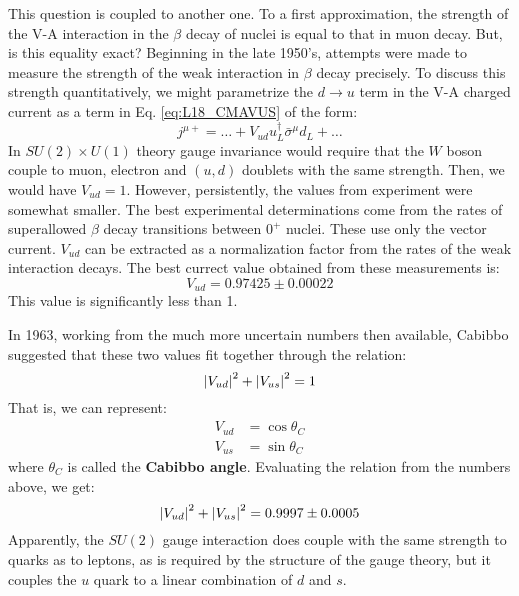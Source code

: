 \documentclass[../../main/main.tex]{subfiles}
\begin{document}
This question is coupled to another one. To a first approximation, the strength of the V-A interaction in the \( \beta \) decay of nuclei is equal to that in muon decay. But, is this equality exact? Beginning in the late 1950's, attempts were made to measure the strength of the weak interaction in \( \beta \) decay precisely. To discuss this strength quantitatively, we might parametrize the \( d \rightarrow u \) term in the V-A charged current as a term in Eq. \ref{eq:L18_CMAVUS} of the form:
\begin{equation}
	j^{\mu +}
	=
	\dots +
	V_{ud} u^{\dag}_L \bar{\sigma}^{\mu} d_L +
	\dots
	\label{eq:}
\end{equation}
In \( SU(2) \times U(1) \) theory gauge invariance would require that the \( W \) boson couple to muon, electron and \( (u,d) \) doublets with the same strength. Then, we would have \( V_{ud} = 1 \). However, persistently, the values from experiment were somewhat smaller. The best experimental determinations come from the rates of superallowed \( \beta \) decay transitions between \( 0^+ \) nuclei. These use only the vector current. \( V_{ud} \) can be extracted as a normalization factor from the rates of the weak interaction decays. The best currect value obtained from these measurements is:
\begin{equation}
	V_{ud}
	=
	0.97425 \pm 0.00022
	\label{eq:}
\end{equation}
This value is significantly less than 1.

In 1963, working from the much more uncertain numbers then available, Cabibbo suggested that these two values fit together through the relation:
\begin{equation}
	\abs{V_{ud}}^2 + \abs{V_{us}}^2
	=
	1
	\label{eq:}
\end{equation}
That is, we can represent:
\begin{align}
	V_{ud} &= \cos\theta_C	\\
	V_{us} &= \sin\theta_C
\end{align}
where \( \theta_C \) is called the \textbf{Cabibbo angle}. Evaluating the relation from the numbers above, we get:
\begin{equation}
	\abs{V_{ud}}^2 + \abs{V_{us}}^2
	=
	0.9997 \pm 0.0005
	\label{eq:}
\end{equation}
Apparently, the \( SU(2) \) gauge interaction does couple with the same strength to quarks as to leptons, as is required by the structure of the gauge theory, but it couples the \( u \) quark to a linear combination of \( d \) and \( s \).
\end{document}
